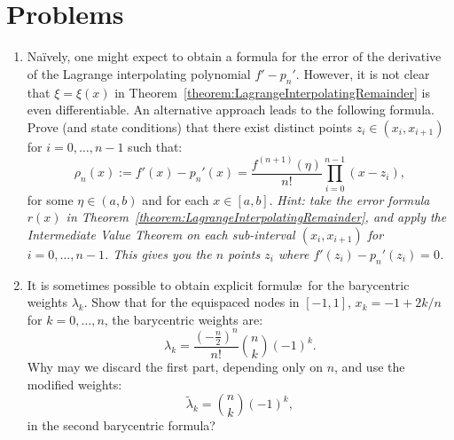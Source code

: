 \section{Problems}
\begin{enumerate}
\item Na\"ively, one might expect to obtain a formula for the error of the derivative of the Lagrange interpolating polynomial $f'-p_n'$. However, it is not clear that $\xi = \xi(x)$ in Theorem~\ref{theorem:LagrangeInterpolatingRemainder} is even differentiable. An alternative approach leads to the following formula. Prove (and state conditions) that there exist distinct points $z_i\in(x_i,x_{i+1})$ for $i=0,\ldots,n-1$ such that:
\[
\rho_n(x) := f'(x) - p_n'(x) = \dfrac{f^{(n+1)}(\eta)}{n!}\prod_{i=0}^{n-1}(x-z_i),
\]
for some $\eta\in(a,b)$ and for each $x\in[a,b]$. {\em Hint: take the error formula $r(x)$ in Theorem~\ref{theorem:LagrangeInterpolatingRemainder}, and apply the Intermediate Value Theorem on each sub-interval $(x_i,x_{i+1})$ for $i=0,\ldots,n-1$. This gives you the $n$ points $z_i$ where $f'(z_i) - p_n'(z_i) = 0$.}
\item It is sometimes possible to obtain explicit formul\ae~for the barycentric weights $\lambda_k$. Show that for the equispaced nodes in $[-1,1]$, $x_k = -1 + 2k/n$ for $k=0,\ldots,n$, the barycentric weights are:
\[
\lambda_k = \dfrac{(-\tfrac{n}{2})^n}{n!}\binom{n}{k}(-1)^k.
\]
Why may we discard the first part, depending only on $n$, and use the modified weights:
\[
\tilde{\lambda}_k = \binom{n}{k}(-1)^k,
\]
in the second barycentric formula?

\end{enumerate}
